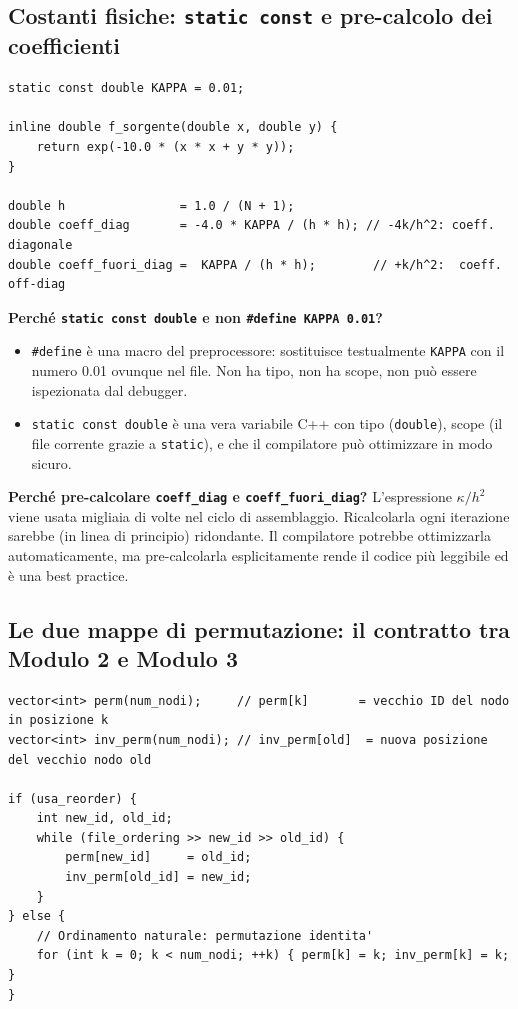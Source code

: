 \documentclass[a4paper,11pt]{article}
\theoremstyle{definition}
\begin{document}
\subsection{Costanti fisiche: \texttt{static const} e pre-calcolo dei coefficienti}

\begin{lstlisting}[style=cpp, caption={Definizione delle costanti fisiche}]
static const double KAPPA = 0.01;

inline double f_sorgente(double x, double y) {
    return exp(-10.0 * (x * x + y * y));
}

double h                = 1.0 / (N + 1);
double coeff_diag       = -4.0 * KAPPA / (h * h); // -4k/h^2: coeff. diagonale
double coeff_fuori_diag =  KAPPA / (h * h);        // +k/h^2:  coeff. off-diag
\end{lstlisting}

\textbf{Perché \texttt{static const double} e non \texttt{\#define KAPPA 0.01}?}
\begin{itemize}
  \item \texttt{\#define} è una macro del preprocessore: sostituisce testualmente \texttt{KAPPA} con il numero 0.01 ovunque nel file. Non ha tipo, non ha scope, non può essere ispezionata dal debugger.
  \item \texttt{static const double} è una vera variabile C++ con tipo (\texttt{double}), scope (il file corrente grazie a \texttt{static}), e che il compilatore può ottimizzare in modo sicuro.
\end{itemize}

\textbf{Perché pre-calcolare \texttt{coeff\_diag} e \texttt{coeff\_fuori\_diag}?} L'espressione $\kappa/h^2$ viene usata migliaia di volte nel ciclo di assemblaggio. Ricalcolarla ogni iterazione sarebbe (in linea di principio) ridondante. Il compilatore potrebbe ottimizzarla automaticamente, ma pre-calcolarla esplicitamente rende il codice più leggibile ed è una best practice.

\subsection{Le due mappe di permutazione: il contratto tra Modulo 2 e Modulo 3}

\begin{lstlisting}[style=cpp, caption={Costruzione di perm e inv\_perm}]
vector<int> perm(num_nodi);     // perm[k]       = vecchio ID del nodo in posizione k
vector<int> inv_perm(num_nodi); // inv_perm[old]  = nuova posizione del vecchio nodo old

if (usa_reorder) {
    int new_id, old_id;
    while (file_ordering >> new_id >> old_id) {
        perm[new_id]     = old_id;
        inv_perm[old_id] = new_id;
    }
} else {
    // Ordinamento naturale: permutazione identita'
    for (int k = 0; k < num_nodi; ++k) { perm[k] = k; inv_perm[k] = k; }
}
\end{lstlisting}
\end{document}
